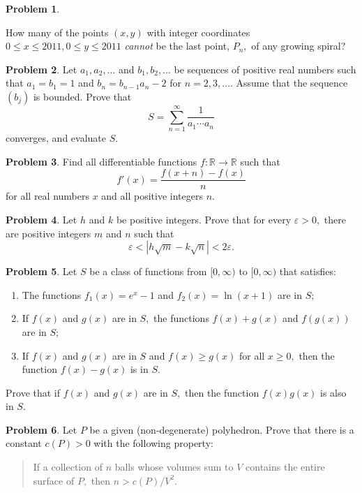 \documentclass{scrartcl}
\theoremstyle{definition}
\newtheorem{prob}{Problem}
\begin{document}
\begin{multicols}{2}
\begin{prob}
\begin{center}
\begin{picture}
		\end{picture}
		\end{center}
		How many of the points $(x,y)$ with integer coordinates $0\le x\le 2011,0\le y\le 2011$ \textit{cannot} be the last point, $P_n,$ of any growing spiral?
	\end{prob}
	\begin{prob}%
		Let $a_1,a_2,\dots$ and $b_1,b_2,\dots$ be sequences of positive real numbers such that $a_1=b_1=1$ and $b_n=b_{n-1}a_n-2$ for $n=2,3,\dots.$ Assume that the sequence $(b_j)$ is bounded. Prove that \[S=\sum_{n=1}^{\infty}\frac1{a_1\cdots a_n}\] converges, and evaluate $S.$
	\end{prob}
	\vfill\null\columnbreak
	\begin{prob}%
		Find all differentiable functions $f:\mathbb{R}\to\mathbb{R}$ such that
		\[f'(x)=\frac{f(x+n)-f(x)}n\]
		for all real numbers $x$ and all positive integers $n.$
	\end{prob}
	\begin{prob}%
		Let $h$ and $k$ be positive integers. Prove that for every $\varepsilon >0,$ there are positive integers $m$ and $n$ such that \[\varepsilon < \left|h\sqrt{m}-k\sqrt{n}\right|<2\varepsilon.\]
	\end{prob}
	\begin{prob}%
		Let $S$ be a class of functions from $[0,\infty)$ to $[0,\infty)$ that satisfies:
		\begin{enumerate}[label = \textbullet, left = 0pt]
			\item The functions $f_1(x)=e^x-1$ and $f_2(x)=\ln(x+1)$ are in $S;$
			\item If $f(x)$ and $g(x)$ are in $S,$ the functions $f(x)+g(x)$ and $f(g(x))$ are in $S;$
			\item If $f(x)$ and $g(x)$ are in $S$ and $f(x)\ge g(x)$ for all $x\ge 0,$ then the function $f(x)-g(x)$ is in $S.$
		\end{enumerate}
		Prove that if $f(x)$ and $g(x)$ are in $S,$ then the function $f(x)g(x)$ is also in $S.$
	\end{prob}
	\begin{prob}%
		Let $P$ be a given (non-degenerate) polyhedron.
		Prove that there is a constant $c(P)>0$ with the following property:
		\begin{quote}
			If a collection of $n$ balls whose volumes sum to $V$ contains the entire surface of $P,$ then $n>c(P)/V^2.$
		\end{quote}
	\end{prob}
	\vfill\null
\end{multicols}
\end{document}
